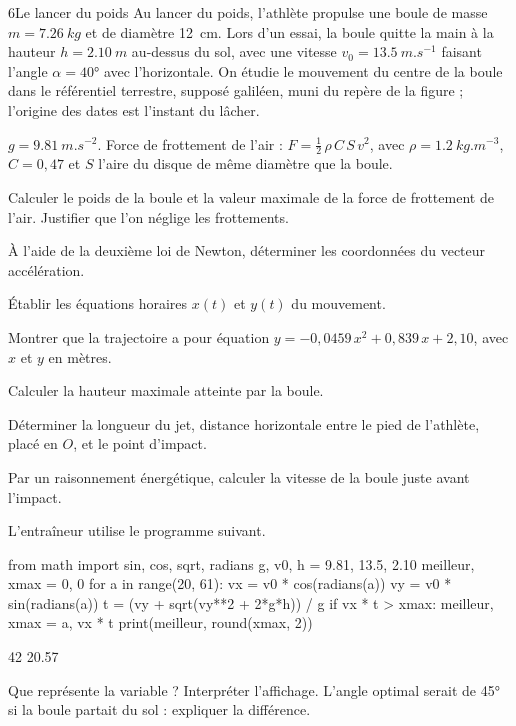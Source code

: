 \begin{exoBac}{6}{Le lancer du poids}
Au lancer du poids, l'athlète propulse une boule de masse $m=\qty{7,26}{kg}$ et de diamètre \qty{12}{cm}. Lors d'un essai, la
boule quitte la main à la hauteur $h=\qty{2,10}{m}$ au-dessus du sol, avec une vitesse $v_0=\qty{13,5}{m.s^{-1}}$ faisant l'angle
$\alpha=\ang{40}$ avec l'horizontale. On étudie le mouvement du centre de la boule dans le référentiel terrestre, supposé
galiléen, muni du repère de la figure ; l'origine des dates est l'instant du lâcher.
\begin{donnees}
$g=\qty{9,81}{m.s^{-2}}$. Force de frottement de l'air : $F=\frac12\,\rho\,C\,S\,v^2$, avec $\rho=\qty{1,2}{kg.m^{-3}}$, $C=0{,}47$ et $S$ l'aire
du disque de même diamètre que la boule.
\end{donnees}
\begin{questions}
\item Calculer le poids de la boule et la valeur maximale de la force de frottement de l'air. Justifier que l'on néglige
les frottements.
\item À l'aide de la deuxième loi de Newton, déterminer les coordonnées du vecteur accélération.
\item Établir les équations horaires $x(t)$ et $y(t)$ du mouvement.
\item Montrer que la trajectoire a pour équation $y=-0{,}0459\,x^2+0{,}839\,x+2{,}10$, avec $x$ et $y$ en mètres.
\item Calculer la hauteur maximale atteinte par la boule.
\item \initiative Déterminer la longueur du jet, distance horizontale entre le pied de l'athlète, placé en $O$, et le point
d'impact.
\item Par un raisonnement énergétique, calculer la vitesse de la boule juste avant l'impact.
\item {}L'entraîneur utilise le programme suivant.
\begin{codecote}[0.6]
\begin{pythoncol}
from math import sin, cos, sqrt, radians
g, v0, h = 9.81, 13.5, 2.10
meilleur, xmax = 0, 0
for a in range(20, 61):
    vx = v0 * cos(radians(a))
    vy = v0 * sin(radians(a))
    t = (vy + sqrt(vy**2 + 2*g*h)) / g
    if vx * t > xmax:
        meilleur, xmax = a, vx * t
print(meilleur, round(xmax, 2))
\end{pythoncol}
\cote
\begin{consolecol}
42 20.57
\end{consolecol}
\end{codecote}
Que représente la variable  ? Interpréter l'affichage. L'angle optimal serait de \ang{45} si la boule partait du sol :
expliquer la différence.
\end{questions}
\end{exoBac}

